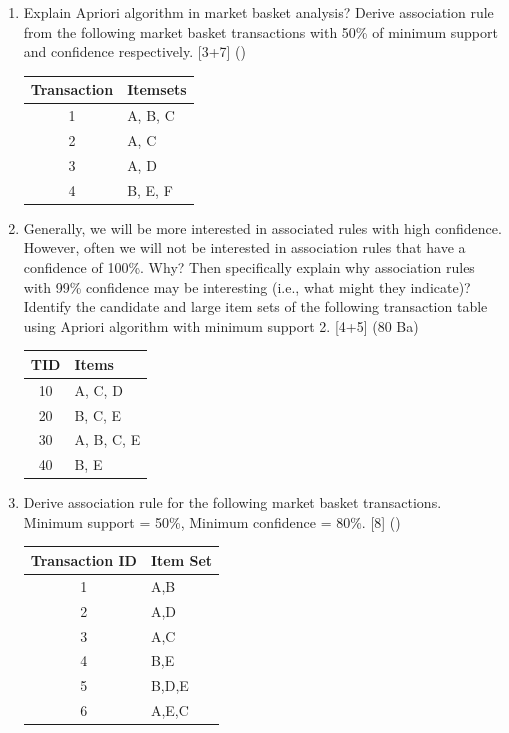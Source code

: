 \documentclass[12pt]{article}
\begin{document}
\begin{enumerate}[topsep=0pt, noitemsep]
      \item Explain Apriori algorithm in market basket analysis? Derive association rule from the following market basket transactions with 50\% of minimum support and confidence respectively. \hfill [3+7] ()\\
        \small
        \begin{tabular}{|c|l|}
          \hline
          Transaction & Itemsets \\ \hline
          1 & A, B, C \\ \hline
          2 & A, C \\ \hline
          3 & A, D \\ \hline
          4 & B, E, F \\ \hline
        \end{tabular}
        \normalsize

      \item Generally, we will be more interested in associated rules with high confidence. However, often we will not be interested in association rules that have a confidence of 100\%. Why? Then specifically explain why association rules with 99\% confidence may be interesting (i.e., what might they indicate)? Identify the candidate and large item sets of the following transaction table using Apriori algorithm with minimum support 2. \hfill [4+5] (80 Ba)\\
        \small
        \begin{tabular}{|c|l|}
          \hline
          TID & Items \\ \hline
          10 & A, C, D \\ \hline
          20 & B, C, E \\ \hline
          30 & A, B, C, E \\ \hline
          40 & B, E \\ \hline
        \end{tabular}
        \normalsize

      \item Derive association rule for the following market basket transactions. Minimum support = 50\%, Minimum confidence = 80\%. \hfill [8] ()\\
        \small
        \begin{tabular}{|c|l|}
          \hline
          Transaction ID & Item Set \\ \hline
          1 & A,B \\ \hline
          2 & A,D \\ \hline
          3 & A,C \\ \hline
          4 & B,E \\ \hline
          5 & B,D,E \\ \hline
          6 & A,E,C \\ \hline
        \end{tabular}
        \normalsize


\end{enumerate}
\end{document}

